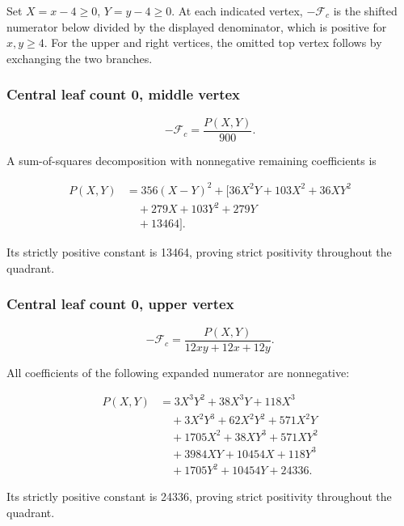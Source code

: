 \documentclass[11pt,reqno]{amsart}
\theoremstyle{plain}
\begin{document}
Set \(X=x-4\ge0\), \(Y=y-4\ge0\). At each indicated vertex, \(-\mathcal F_c\) is the shifted numerator below divided by the displayed denominator, which is positive for \(x,y\ge4\). For the upper and right vertices, the omitted top vertex follows by exchanging the two branches.

\par\noindent\begin{minipage}{\linewidth}
\subsubsection*{Central leaf count 0, middle vertex}\label{central-leaf-count-0-middle-vertex}

\[
-\mathcal F_c=\frac{P(X,Y)}{900}.
\]

A sum-of-squares decomposition with nonnegative remaining coefficients is

\[
\begin{aligned}
P(X,Y)&=356 \left(X - Y\right)^{2}+\bigl[36 X^{2} Y + 103 X^{2} + 36 X Y^{2} \\
&\quad + 279 X + 103 Y^{2} + 279 Y \\
&\quad + 13464\bigr].
\end{aligned}
\]

Its strictly positive constant is 13464, proving strict positivity throughout the quadrant.
\end{minipage}\par\medskip

\par\noindent\begin{minipage}{\linewidth}
\subsubsection*{Central leaf count 0, upper vertex}\label{central-leaf-count-0-upper-vertex}

\[
-\mathcal F_c=\frac{P(X,Y)}{12 x y + 12 x + 12 y}.
\]

All coefficients of the following expanded numerator are nonnegative:

\[
\begin{aligned}
P(X,Y)&=3 X^{3} Y^{2} + 38 X^{3} Y + 118 X^{3} \\
&\quad + 3 X^{2} Y^{3} + 62 X^{2} Y^{2} + 571 X^{2} Y \\
&\quad + 1705 X^{2} + 38 X Y^{3} + 571 X Y^{2} \\
&\quad + 3984 X Y + 10454 X + 118 Y^{3} \\
&\quad + 1705 Y^{2} + 10454 Y + 24336.
\end{aligned}
\]

Its strictly positive constant is 24336, proving strict positivity throughout the quadrant.
\end{minipage}\par\medskip
\end{document}

